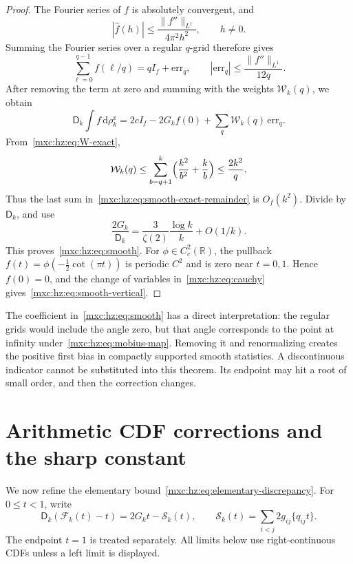 \documentclass[11pt]{article}
\numberwithin{equation}{section}
\theoremstyle{definition}
\theoremstyle{remark}
\newcommand{\dd}{\,\mathrm d}
\newcommand{\hzrho}{\rho^{\mathrm z}}
\begin{document}
\begin{proof}
The Fourier series of $f$ is absolutely convergent, and
\[
 |\widehat f(h)|\le\frac{\|f''\|_{L^1}}{4\pi^2h^2},\qquad h\ne0.
\]
Summing the Fourier series over a regular $q$-grid therefore gives
\[
 \sum_{\ell=0}^{q-1}f(\ell/q)=qI_f+\mathrm{err}_q,\qquad
 |\mathrm{err}_q|\le\frac{\|f''\|_{L^1}}{12q}.
\]
After removing the term at zero and summing with the weights
$\mathcal W_k(q)$, we obtain
\begin{equation}\label{mxc:hz:eq:smooth-exact-remainder}
 \mathsf D_k\int f\dd\hzrho_k
 =2cI_f-2G_kf(0)+\sum_q\mathcal W_k(q)\,\mathrm{err}_q.
\end{equation}
From~\eqref{mxc:hz:eq:W-exact},
\[
 \mathcal W_k(q)\le
 \sum_{b=q+1}^k\Bigl(\frac{k^2}{b^2}+\frac{k}{b}\Bigr)
 \le\frac{2k^2}{q}.
\]
Thus the last sum in~\eqref{mxc:hz:eq:smooth-exact-remainder} is
$O_f(k^2)$. Divide by $\mathsf D_k$, and use
\[
 \frac{2G_k}{\mathsf D_k}=\frac3{\zeta(2)}\frac{\log k}{k}+O(1/k).
\]
This proves~\eqref{mxc:hz:eq:smooth}. For $\phi\in C_c^2(\mathbb R)$, the
pullback $f(t)=\phi(-\frac12\cot(\pi t))$ is periodic $C^2$ and is zero
near $t=0,1$. Hence $f(0)=0$, and the change of variables
in~\eqref{mxc:hz:eq:cauchy} gives~\eqref{mxc:hz:eq:smooth-vertical}.
\end{proof}

The coefficient in~\eqref{mxc:hz:eq:smooth} has a direct interpretation:
the regular grids would include the angle zero, but that angle corresponds
to the point at infinity under~\eqref{mxc:hz:eq:mobius-map}. Removing it and
renormalizing creates the positive first bias in compactly supported
smooth statistics. A discontinuous indicator cannot be substituted into
this theorem. Its endpoint may hit a root of small order, and then the
correction changes.

\section{Arithmetic CDF corrections and the sharp constant}\label{mxc:hz:sec:sharp}

We now refine the elementary
bound~\eqref{mxc:hz:eq:elementary-discrepancy}. For $0\le t<1$, write
\begin{equation}\label{mxc:hz:ar:eq:exact-cdf}
 \mathsf D_k(\mathcal F_k(t)-t)=2G_kt-\mathcal S_k(t),\qquad
 \mathcal S_k(t)=\sum_{i<j}2g_{ij}\{q_{ij}t\}.
\end{equation}
The endpoint $t=1$ is treated separately. All limits below use
right-continuous CDFs unless a left limit is displayed.
\end{document}
